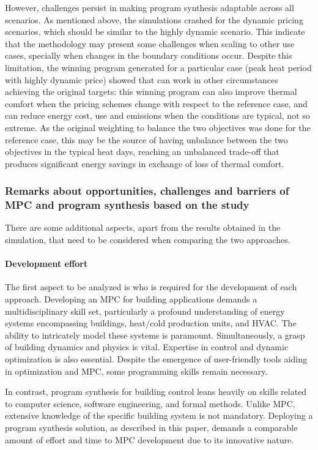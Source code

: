However, challenges persist in making program synthesis adaptable across all scenarios. As mentioned above, the simulations crashed for the dynamic pricing scenarios, which should be similar to the highly dynamic scenario. This indicate that the methodology may present some challenges when scaling to other use cases, specially when changes in the boundary conditions occur. Despite this limitation, the winning program generated for a particular case (peak heat period with highly dynamic price) showed that can work in other circumstances achieving the original targets: this winning program can also improve thermal comfort when the pricing schemes change with respect to the reference case, and can reduce energy cost, use and emissions when the conditions are typical, not so extreme. As the original weighting to balance the two objectives was done for the reference case, this may be the source of having unbalance between the two objectives in the typical heat days, reaching an unbalanced trade-off that produces significant energy savings in exchange of loss of thermal comfort.

\subsubsection{Remarks about opportunities, challenges and barriers of MPC and program synthesis based on the study}

There are some additional aspects, apart from the results obtained in the simulation, that need to be considered when comparing the two approaches.

\paragraph{Development effort}
The first aspect to be analyzed is who is required for the development of each approach. 
Developing an MPC for building applications demands a multidisciplinary skill set, particularly a profound understanding of energy systems encompassing buildings, heat/cold production units, and HVAC. The ability to intricately model these systems is paramount. Simultaneously, a grasp of building dynamics and physics is vital. Expertise in control and dynamic optimization is also essential. Despite the emergence of user-friendly tools aiding in optimization and MPC, some programming skills remain necessary. 

In contrast, program synthesis for building control leans heavily on skills related to computer science, software engineering, and formal methods. Unlike MPC, extensive knowledge of the specific building system is not mandatory. Deploying a program synthesis solution, as described in this paper, demands a comparable amount of effort and time to MPC development due to its innovative nature.

